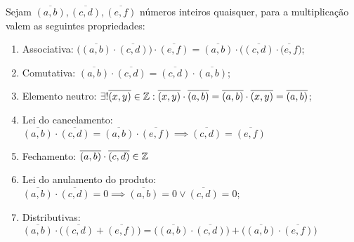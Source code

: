 \documentclass[../main.tex]{subfiles}
\begin{document}
\begin{prop}{Sejam $\overline{(a,b)}, \overline{(c,d)}, \overline{(e,f)}$ números inteiros quaisquer, para a multiplicação valem as seguintes propriedades:}
    \begin{enumerate}[label=(\roman*)]
        \item Associativa: $\big(\overline{(a,b)} \cdot \overline{(c,d)}\big) \cdot  \overline{(e,f)} = \overline{(a,b)} \cdot \big(\overline{(c,d)} \cdot  \overline{(e,f}\big)$;
        
        \item Comutativa: $\overline{(a,b)} \cdot \overline{(c,d)} =  \overline{(c,d)} \cdot \overline{(a,b)}$;
        
        \item Elemento neutro: $\exists!\overline{(x,y)} \in \mathbb{Z} : \overline{(x,y)} \cdot \overline{(a,b)} = \overline{(a,b)} \cdot \overline{(x,y)} = \overline{(a,b)}$;
        
        \item Lei do cancelamento: $\overline{(a,b)} \cdot \overline{(c,d)} = \overline{(a,b)} \cdot \overline{(e,f)} \implies \overline{(c,d)} = \overline{(e,f)}$
        
        \item Fechamento: $\overline{(a,b)} \cdot \overline{(c,d)} \in \mathbb{Z}$
        
        \item Lei do anulamento do produto:
            $\overline{(a,b)} \cdot \overline{(c,d)} = 0 \implies \overline{(a,b)} = 0 \lor \overline{(c,d)}=0$;
        
        \item Distributivas: $\overline{(a,b)} \cdot \big( \overline{(c,d)} + \overline{(e,f)} \big) = \big( \overline{(a,b)} \cdot \overline{(c,d)} \big) + \big( \overline{(a,b)} \cdot \overline{(e,f)} \big)$
    \end{enumerate}
\end{prop}
\end{document}

